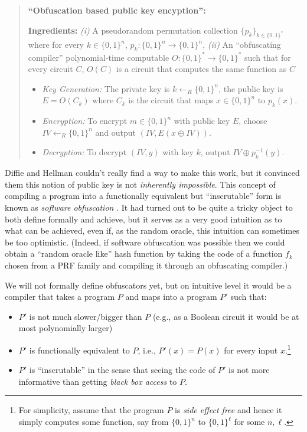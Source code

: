\begin{quote}
\textbf{``Obfuscation based public key encyption'':}

\textbf{Ingredients:} \emph{(i)} A pseudorandom permutation collection
\(\{ p_k \}_{k\in \{0,1\}^*}\) where for every \(k\in \{0,1\}^n\),
\(p_k:\{0,1\}^n \rightarrow \{0,1\}^n\), \emph{(ii)} An ``obfuscating
compiler'' polynomial-time computable
\(O:\{0,1\}^* \rightarrow \{0,1\}^*\) such that for every circuit \(C\),
\(O(C)\) is a circuit that computes the same function as \(C\)

\begin{itemize}
\item
  \emph{Key Generation:} The private key is
  \(k \leftarrow_R \{0,1\}^n\), the public key is \(E=O(C_k)\) where
  \(C_k\) is the circuit that maps \(x\in \{0,1\}^n\) to \(p_k(x)\).
\item
  \emph{Encryption:} To encrypt \(m\in \{0,1\}^n\) with public key
  \(E\), choose \(\ensuremath{\mathit{IV}} \leftarrow_R \{0,1\}^n\) and
  output
  \((\ensuremath{\mathit{IV}}, E(x \oplus \ensuremath{\mathit{IV}}))\).
\item
  \emph{Decryption:} To decrypt \((\ensuremath{\mathit{IV}},y)\) with
  key \(k\), output \(\ensuremath{\mathit{IV}} \oplus p_k^{-1}(y)\).
\end{itemize}
\end{quote}

Diffie and Hellman couldn't really find a way to make this work, but it
convinced them this notion of public key is not \emph{inherently
impossible}. This concept of compiling a program into a functionally
equivalent but ``inscrutable'' form is known as \emph{software
obfuscation} . It had turned out to be quite a tricky object to both
define formally and achieve, but it serves as a very good intuition as
to what can be achieved, even if, as the random oracle, this intuition
can sometimes be too optimistic. (Indeed, if software obfuscation was
possible then we could obtain a ``random oracle like'' hash function by
taking the code of a function \(f_k\) chosen from a PRF family and
compiling it through an obfuscating compiler.)

We will not formally define obfuscators yet, but on intuitive level it
would be a compiler that takes a program \(P\) and maps into a program
\(P'\) such that:

\begin{itemize}
\tightlist
\item
  \(P'\) is not much slower/bigger than \(P\) (e.g., as a Boolean
  circuit it would be at most polynomially larger)
\item
  \(P'\) is functionally equivalent to \(P\), i.e., \(P'(x)=P(x)\) for
  every input \(x\).\footnote{For simplicity, assume that the program
    \(P\) is \emph{side effect free} and hence it simply computes some
    function, say from \(\{0,1\}^n\) to \(\{0,1\}^\ell\) for some
    \(n,\ell\).}
\item
  \(P'\) is ``inscrutable'' in the sense that seeing the code of \(P'\)
  is not more informative than getting \emph{black box access} to \(P\).
\end{itemize}


